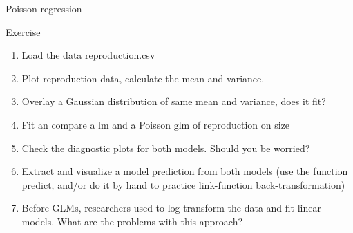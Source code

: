 \documentclass[10pt]{beamer}\usepackage[]{graphicx}\usepackage[]{color}
\begin{document}
\begin{frame}[fragile]{Poisson regression}


  
  
  \begin{exampleblock}{Exercise}
    \begin{enumerate}
      \item Load the data reproduction.csv
      \item Plot reproduction data, calculate the mean and variance. 
      \item Overlay a Gaussian distribution of same mean and variance, does it fit?
      \item Fit an compare a lm and a Poisson glm of reproduction on size 
      \item Check the diagnostic plots for both models. Should you be worried?
      \item Extract and visualize a model prediction from both models (use the function predict, and/or do it by hand to practice link-function back-transformation)
      \item Before GLMs, researchers used to log-transform the data and fit linear models. What are the problems with this approach?
    \end{enumerate}
  \end{exampleblock}

\end{frame}
\end{document}
